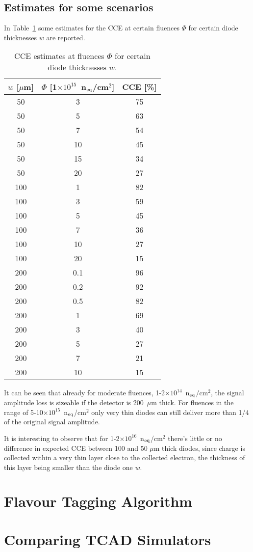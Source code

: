 \subsection{Estimates for some scenarios}

In Table~\ref{tab:cce_scenarios} some estimates for the CCE at certain fluences $\Phi$ for 
certain diode thicknesses $w$ are reported.

\begin{table}[!htbp]
\centering
\begin{tabular}{ccc}
\hline
$w$ [$\mu$m] & $\Phi$ [1$\times10^{15}$~n$_{\rm eq}$/cm$^2$] & CCE [\%] \\
\hline
\hline
50 & 3 & 75 \\
50 & 5 & 	63 \\
50 & 7 & 54 \\
50 & 	10 & 	45 \\
50 & 15 & 34 \\
50 & 20 & 27\\
\hline
100 & 1 & 82 \\
100 & 3 & 59 \\
100 & 5 & 	45 \\
100 & 7 & 36 \\
100 & 10 & 27 \\
100 & 20 & 15 \\
\hline
200 & 0.1 & 96\\
200 & 0.2 & 92\\
200 & 0.5 & 82\\
200 & 1 & 69 \\
200 & 3 & 40 \\
200 & 5 & 	27 \\
200 & 7 & 21 \\
200 & 10 & 15 \\
\hline
\end{tabular}
\caption{\label{tab:cce_scenarios}CCE estimates at fluences $\Phi$ for 
certain diode thicknesses $w$.}
\end{table}

It can be seen that already for moderate fluences, 1-2$\times10^{14}$~n$_{\rm eq}$/cm$^2$, 
the signal amplitude loss is sizeable if the detector is 200~$\mu$m thick. 
For fluences in the range of 5-10$\times10^{15}$~n$_{\rm eq}$/cm$^2$ only very thin diodes 
can still deliver more than 1/4 of the original signal amplitude. 

It is interesting to observe that for 1-2$\times10^{16}$~n$_{\rm eq}$/cm$^2$ there's little or no 
difference in expected CCE between 100 and 50 $\mu$m thick diodes, since charge is collected 
within a very thin layer close to the collected electron, the thickness of this layer being smaller 
than the diode one $w$.




\section{Flavour Tagging Algorithm}

\section{Comparing TCAD Simulators}
